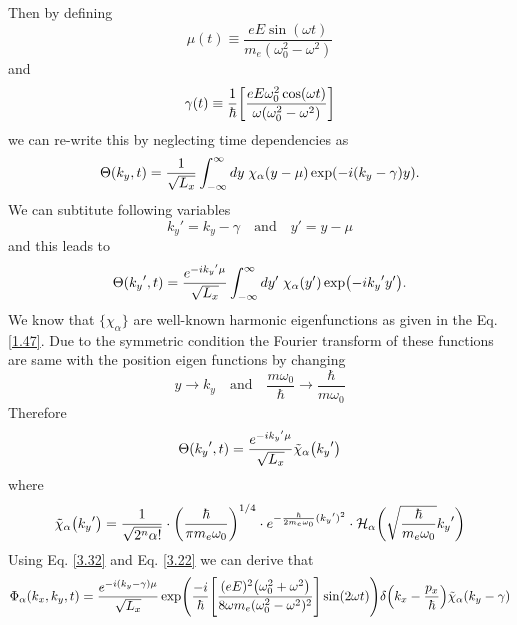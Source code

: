 Then by defining
\begin{equation} \label{3.26}
  \mu(t) \equiv \frac{eE\sin(\omega t)}{m_e(\omega_0^2 - \omega^2)}
\end{equation}
and
\begin{equation} \label{3.27}
  \gamma(t) \equiv
  \frac{1}{\hbar}
  \qty[ \frac{eE\omega_0^2\cos(\omega t)}{\omega(\omega_0^2 - \omega^2)}]
\end{equation}
we can re-write this by neglecting time dependencies as
\begin{equation} \label{3.28}
  \Theta(k_y,t) =
  \frac{1}{\sqrt{L_x}}
  \int_{-\infty}^{\infty} dy\;
  \chi_{\alpha}\qty(y - \mu )
  \exp(
    -i\qty(k_y - \gamma)
    y).
\end{equation}
We can subtitute following variables
\begin{equation} \label{3.29}
  {k_y}' = k_y -\gamma \quad \text{and} \quad y' = y -\mu
\end{equation}
and this leads to
\begin{equation} \label{3.30}
  \Theta({k_y}' ,t) =
  \frac{e^{-i {k_y}'\mu}}{\sqrt{L_x}}
  \int_{-\infty}^{\infty} dy'\;
  \chi_{\alpha}\qty(y')
  \exp(-i{k_y}' y').
\end{equation}
We know that $\{\chi_{\alpha}\}$ are well-known harmonic eigenfunctions as given in the Eq. \eqref{1.47}. Due to the symmetric condition the Fourier transform of these functions are same with the position eigen functions by changing
\begin{equation} \label{3.31}
  y \rightarrow k_y \quad \text{and} \quad
  \frac{m\omega_0}{\hbar} \rightarrow \frac{\hbar}{m\omega_0}
\end{equation}
Therefore
\begin{equation} \label{3.32}
  \Theta({k_y}' ,t) =
  \frac{e^{-i {k_y}'\mu}}{\sqrt{L_x}}
  \tilde{\chi}_{\alpha}\qty({k_y}')
\end{equation}
where
\begin{equation} \label{3.33}
  \tilde{\chi}_{\alpha}\qty({k_y}') =
  \frac{1}{\sqrt{2^{n}{\alpha}!}}  \cdot
  \bigg(\frac{\hbar}{\pi m_e\omega_0}\bigg)^{1/4}
  \cdot e^{-\frac{\hbar}{2 m_e\omega_0 } ({k_y}')^2} \cdot
  \mathcal{H}_{\alpha} \bigg(\sqrt{\frac{\hbar}{m_e \omega_0}}{k_y}'\bigg)
\end{equation}
Using Eq. \eqref{3.32} and Eq. \eqref{3.22} we can derive that
\begin{equation} \label{3.34}
    \Phi_{\alpha}(k_x,k_y,t)  =
    \frac{e^{-i \qty(k_y -\gamma)\mu}}{\sqrt{L_x}}
    \exp(\frac{-i}{\hbar}
    \qty[
    \frac{(eE)^2\qty(\omega_0^2 + \omega^2)}{8\omega m_e(\omega_0^2 - \omega^2)^2}
    ]\sin(2\omega t))
    \delta\qty(k_x -\frac{p_x}{\hbar})
    \tilde{\chi}_{\alpha}\qty(k_y -\gamma)
\end{equation}
